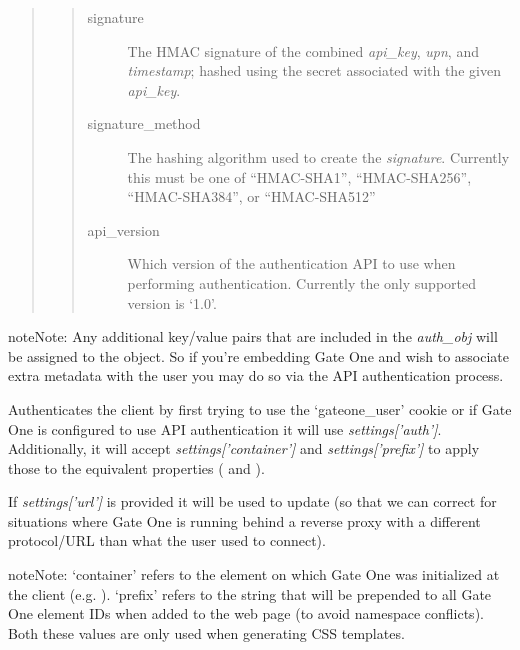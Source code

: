 \documentclass[letterpaper,10pt,openany]{sphinxmanual}
\begin{document}
\begin{fulllineitems}
\begin{fulllineitems}
\begin{quote}
\begin{quote}
\begin{description}
\item[{signature}] \leavevmode
The HMAC signature of the combined \emph{api\_key}, \emph{upn}, and
\emph{timestamp}; hashed using the secret associated with the given
\emph{api\_key}.

\item[{signature\_method}] \leavevmode
The hashing algorithm used to create the \emph{signature}.  Currently
this must be one of ``HMAC-SHA1'', ``HMAC-SHA256'', ``HMAC-SHA384'',
or ``HMAC-SHA512''

\item[{api\_version}] \leavevmode
Which version of the authentication API to use when performing
authentication.  Currently the only supported version is `1.0'.

\end{description}\end{quote}
\end{quote}

\begin{notice}{note}{Note:}
Any additional key/value pairs that are included in the \emph{auth\_obj}
will be assigned to the  object.  So if you're
embedding Gate One and wish to associate extra metadata with the
user you may do so via the API authentication process.
\end{notice}

\end{fulllineitems}


\begin{fulllineitems}
\label{Developer/server:gateone.core.server.ApplicationWebSocket.authenticate}
Authenticates the client by first trying to use the `gateone\_user'
cookie or if Gate One is configured to use API authentication it will
use \emph{settings{[}'auth'{]}}.  Additionally, it will accept
\emph{settings{[}'container'{]}} and \emph{settings{[}'prefix'{]}} to apply those to the
equivalent properties ( and ).

If \emph{settings{[}'url'{]}} is provided it will be used to update
 (so that we can correct for situations where Gate One
is running behind a reverse proxy with a different protocol/URL than
what the user used to connect).

\begin{notice}{note}{Note:}
`container' refers to the element on which Gate One was initialized
at the client (e.g. ).  `prefix' refers to the string that
will be prepended to all Gate One element IDs when added to the web
page (to avoid namespace conflicts).  Both these values are only
used when generating CSS templates.
\end{notice}


\end{fulllineitems}
\end{fulllineitems}
\end{document}
